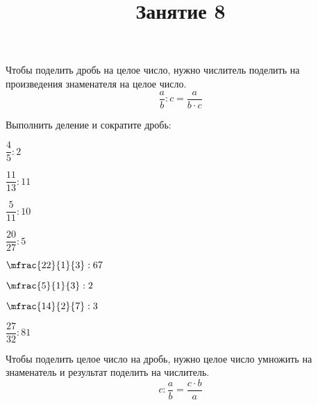 \newpage
\title{Занятие 8}
\begin{definit}
	Чтобы поделить дробь на целое число, нужно числитель поделить на произведения знаменателя на целое число.
	\[ \dfrac{a}{b}:c=\dfrac{a}{b\cdot c} \]
\end{definit}
\begin{listofex}
	\item Выполнить деление и сократите дробь:
	\begin{enumcols}[itemcolumns=4]
		\item \( \dfrac{4}{5}:2 \)
		\item \( \dfrac{11}{13}:11 \)
		\item \( \dfrac{5}{11}:10 \)
		\item \( \dfrac{20}{27}:5 \)
		\item \( \mfrac{22}{1}{3}:67 \)
		\item \( \mfrac{5}{1}{3}:2 \)
		\item \( \mfrac{14}{2}{7}:3 \)
		\item \( \dfrac{27}{32}:81 \)
	\end{enumcols}
\end{listofex}
\begin{definit}
	Чтобы поделить целое число на дробь, нужно целое число умножить на знаменатель и результат поделить на числитель.
	\[ c:\dfrac{a}{b}=\dfrac{c\cdot b}{a} \]
\end{definit}
